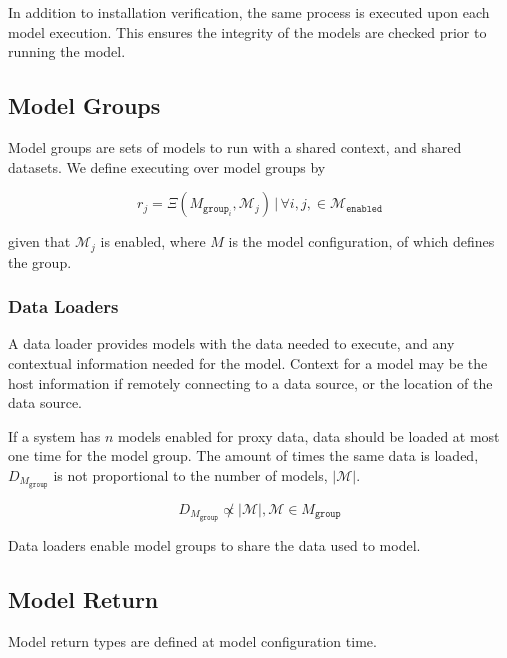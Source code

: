 \documentclass[10pt, titlepage, twocolumn]{report}
\begin{document}
In addition to installation verification, the same process is executed upon each model execution. This ensures the integrity of the models are checked prior to running the model.



\subsection{Model Groups}
Model groups are sets of models to run with a shared context, and shared datasets. We define executing over model groups by

\begin{equation}
r_j = \Xi (M_{\texttt{group}_i},  \boldsymbol{\mathcal{M}}_j) \, \vert \, \forall i,j, \in \boldsymbol{\mathcal{M}}_{\texttt{enabled}}
\end{equation}

given that \(\boldsymbol{\mathcal{M}}_j\) is enabled, where \(M\) is the model configuration, of which defines the group.

\subsubsection{Data Loaders}

A data loader provides models with the data needed to execute, and any contextual information needed for the model. Context for a model may be the host information if remotely connecting to a data source, or the location of the data source.

If a system has \(n\) models enabled for proxy data, data should be loaded at most one time for the model group. The amount of times the same data is loaded, \(D_{M_{\texttt{group}}} \) is not proportional to the number of models, \(\vert \boldsymbol{\mathcal{M}} \vert\). 

\begin{equation}
D_{M_{\texttt{group}}} \not \propto \vert \boldsymbol{\mathcal{M}} \vert , \boldsymbol{\mathcal{M}} \in M_{\texttt{group}}
\end{equation}

Data loaders enable model groups to share the data used to model.


\subsection{Model Return}

Model return types are defined at model configuration time.
\end{document}
